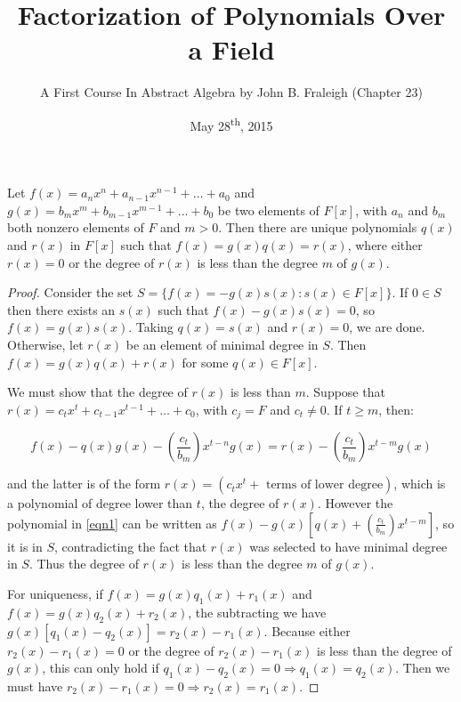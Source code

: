 \documentclass[a4paper,8pt]{article}
\title{Factorization of Polynomials Over a Field}
\author{A First Course In Abstract Algebra by John B. Fraleigh (Chapter 23)}
\date{May 28\textsuperscript{th}, 2015}
\begin{document}
\maketitle
{}

\begin{outline}

    Let \(f(x) = a_nx^n + a_{n-1}x^{n-1} + \ldots + a_0\)
    and \(g(x) = b_mx^m + b_{m-1}x^{m-1} + \ldots + b_0\) be two elements of \(F[x]\), with \(a_n\) and \(b_m\)
    both nonzero elements of \(F\) and \(m > 0\). Then there are unique polynomials \(q(x)\) and \(r(x)\) in \(F[x]\)
    such that \(f(x) = g(x)q(x) = r(x)\), where either \(r(x) = 0\) or the degree of \(r(x)\) is less than the degree
    \(m\) of \(g(x)\).

    \begin{proof}
      Consider the set \(S = \{f(x) =- g(x)s(x) : s(x) \in F[x]\}\). If \(0 \in S\) then there exists an \(s(x)\)
      such that \(f(x) - g(x)s(x) = 0\), so \(f(x) = g(x)s(x)\). Taking \(q(x) = s(x)\) and \(r(x) = 0\), we are done.
      Otherwise, let \(r(x)\) be an element of minimal degree in \(S\). Then \(f(x) = g(x)q(x) + r(x)\) for some \(q(x)
      \in F[x]\).

      We must show that the degree of \(r(x)\) is less than \(m\). Suppose that \(r(x) = c_tx^t + c_{t-1}x^{t-1}
      + \ldots + c_0\), with \(c_j = F\) and \(c_t \neq 0\). If \(t \geq m\), then:

      \begin{equation}
      \label{eqn1}
      f(x) - q(x)g(x) - (\frac{c_t}{b_m})x^{t-n}g(x) = r(x) - (\frac{c_t}{b_m})x^{t-m}g(x)
      \end{equation}

      and the latter is of the form \(r(x) = (c_tx^t + \text{ terms of lower degree})\), which is a polynomial of degree
      lower than \(t\), the degree of \(r(x)\). However the polynomial in \eqref{eqn1} can be written as
      \(f(x) - g(x)[q(x) + (\frac{c_t}{b_m})x^{t-m}]\), so it is in \(S\), contradicting the fact that
      \(r(x)\) was selected to have minimal degree in \(S\). Thus the degree of \(r(x)\) is less than the degree \(m\) of
      \(g(x)\).

      For uniqueness, if \(f(x) = g(x)q_1(x) + r_1(x)\) and \(f(x) = g(x)q_2(x) + r_2(x)\), the subtracting we have
      \(g(x)[q_1(x)-q_2(x)] = r_2(x) - r_1(x)\). Because either \(r_2(x) - r_1(x) = 0\) or the degree of \(r_2(x) - r_1(x)\)
      is less than the degree of \(g(x)\), this can only hold if \(q_1(x) - q_2(x) = 0 \Rightarrow q_1(x) = q_2(x)\). Then
      we must have \(r_2(x) - r_1(x) = 0 \Rightarrow r_2(x) = r_1(x)\).
    \end{proof}


\end{outline}
\end{document}
